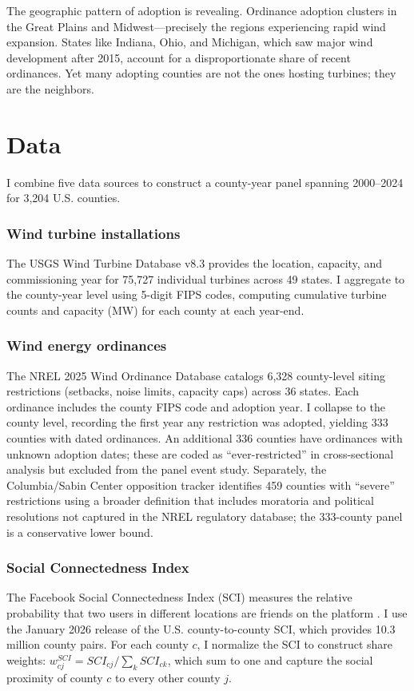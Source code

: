 \documentclass[12pt]{article}
\begin{document}
The geographic pattern of adoption is revealing. Ordinance adoption clusters in the Great Plains and Midwest---precisely the regions experiencing rapid wind expansion. States like Indiana, Ohio, and Michigan, which saw major wind development after 2015, account for a disproportionate share of recent ordinances. Yet many adopting counties are not the ones hosting turbines; they are the neighbors.


\section{Data}

I combine five data sources to construct a county-year panel spanning 2000--2024 for 3,204 U.S. counties.

\subsubsection*{Wind turbine installations} The USGS Wind Turbine Database v8.3 \citep{uswtdb2026} provides the location, capacity, and commissioning year for 75,727 individual turbines across 49 states. I aggregate to the county-year level using 5-digit FIPS codes, computing cumulative turbine counts and capacity (MW) for each county at each year-end.

\subsubsection*{Wind energy ordinances} The NREL 2025 Wind Ordinance Database \citep{nrel2025} catalogs 6,328 county-level siting restrictions (setbacks, noise limits, capacity caps) across 36 states. Each ordinance includes the county FIPS code and adoption year. I collapse to the county level, recording the first year any restriction was adopted, yielding 333 counties with dated ordinances. An additional 336 counties have ordinances with unknown adoption dates; these are coded as ``ever-restricted'' in cross-sectional analysis but excluded from the panel event study. Separately, the Columbia/Sabin Center opposition tracker identifies 459 counties with ``severe'' restrictions using a broader definition that includes moratoria and political resolutions not captured in the NREL regulatory database; the 333-county panel is a conservative lower bound.

\subsubsection*{Social Connectedness Index} The Facebook Social Connectedness Index (SCI) measures the relative probability that two users in different locations are friends on the platform \citep{bailey2018}. I use the January 2026 release of the U.S. county-to-county SCI, which provides 10.3 million county pairs. For each county $c$, I normalize the SCI to construct share weights: $w_{cj}^{SCI} = SCI_{cj} / \sum_k SCI_{ck}$, which sum to one and capture the social proximity of county $c$ to every other county $j$.
\end{document}
